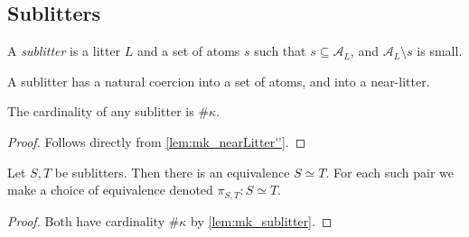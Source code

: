 \subsection{Sublitters}

\begin{definition}
    A \emph{sublitter} is a litter \( L \) and a set of atoms \( s \) such that \( s \subseteq \mathcal A_L \), and \( \mathcal A_L \setminus s \) is small.
\end{definition}
A sublitter has a natural coercion into a set of atoms, and into a near-litter.
\begin{lemma}
    \label{lem:mk_sublitter}
    The cardinality of any sublitter is \( \#\kappa \).
\end{lemma}
\begin{proof}
    Follows directly from \cref{lem:mk_nearLitter''}.
\end{proof}
\begin{lemma}
    \label{lem:Sublitter.equiv}
    Let \( S, T \) be sublitters.
    Then there is an equivalence \( S \simeq T \).
    For each such pair we make a choice of equivalence denoted \( \pi_{S, T} : S \simeq T \).
\end{lemma}
\begin{proof}
    Both have cardinality \( \#\kappa \) by \cref{lem:mk_sublitter}.
\end{proof}
